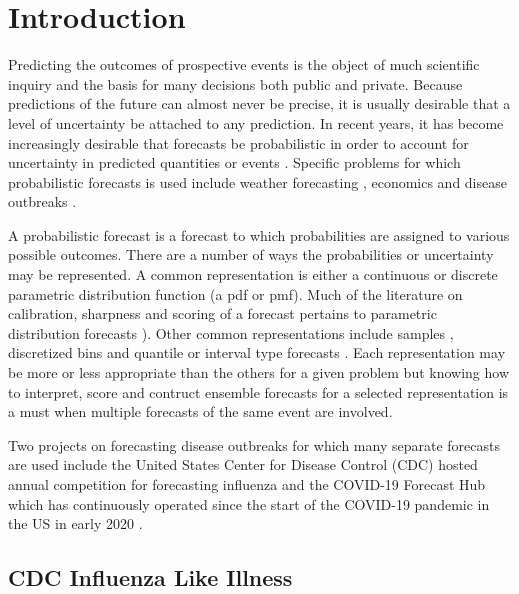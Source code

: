 \documentclass{article}\usepackage[]{graphicx}\usepackage[]{color}
\begin{document}
\section{Introduction}
Predicting the outcomes of prospective events is the object of much scientific
inquiry and the basis for many decisions both public and private. Because 
predictions of the future can almost never be precise, it is usually desirable
that a level of uncertainty be attached to any prediction. In recent years, it
has become increasingly desirable that forecasts be probabilistic in order to 
account for uncertainty in predicted quantities or events 
\cite{gneiting2014probabilistic}. Specific problems for 
which probabilistic forecasts is used include weather forecasting
\cite{baran2018combining}, economics \cite{groen2013real} and disease outbreaks
\cite{yamana2016superensemble}.

A probabilistic forecast is a forecast to which probabilities are assigned to 
various possible outcomes. There are a number of ways the probabilities or 
uncertainty may be represented. A common representation is either a continuous 
or
discrete parametric distribution function (a pdf or pmf). Much of the literature 
on calibration, sharpness and scoring of a forecast pertains to parametric 
distribution forecasts
\cite[see, e.g.]{gneiting2007probabilistic,gneiting2013combining,baran2018combining}).
Other common representations include samples \cite{krueger2016probabilistic}, 
discretized bins 
and quantile or interval type forecasts \cite{taylor2021evaluating} 
\cite{bracher2021evaluating}. Each representation may be more or less 
appropriate than the others for a given problem but knowing how to interpret, 
score and contruct ensemble forecasts for a selected representation is a must 
when multiple forecasts of the same event are involved.

Two projects on forecasting disease outbreaks for which many separate forecasts 
are used include the United States Center for Disease Control (CDC) hosted
annual competition for forecasting influenza \cite{cdcflusight}
and the COVID-19 Forecast Hub which has 
continuously operated since the start of the COVID-19 pandemic in the US in 
early 2020 \cite{Cramer2021-hub-dataset}.

\subsection{CDC Influenza Like Illness}
\end{document}
